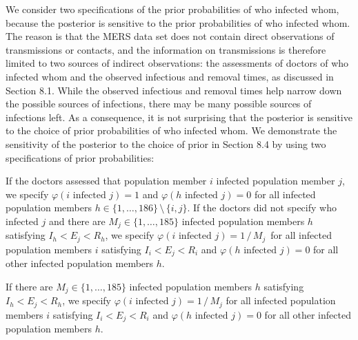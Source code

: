 We consider two specifications of the prior probabilities of who infected whom,
because the posterior is sensitive to the prior probabilities of who infected whom.
The reason is that the MERS data set does not contain direct observations of transmissions or contacts,
and the information on transmissions is therefore limited to two sources of indirect observations:
the assessments of doctors of who infected whom and the observed infectious and removal times,
as discussed in Section 8.1.
While the observed infectious and removal times help narrow down the possible sources of infections,
there may be many possible sources of infections left.
As a consequence,
it is not surprising that the posterior is sensitive to the choice of prior probabilities of who infected whom.
We demonstrate the sensitivity of the posterior to the choice of prior in Section 8.4 by using two specifications of prior probabilities:
\bi 
\item[(a)] If the doctors assessed that population member $i$ infected population member $j$,
we specify $\varphi(\mbox{$i$ infected $j$}) = 1$ and $\varphi(\mbox{$h$ infected $j$}) = 0$ for all infected population members $h \in \{1, \dots, 186\}\, \setminus\, \{i, j\}$.
If the doctors did not specify who infected $j$ and there are $M_j \in \{1, \dots, 185\}$ infected population members $h$ satisfying $I_h < E_j < R_h$,
we specify $\varphi(\mbox{$i$ infected $j$}) = 1\, /\, M_j$\, for all infected population members $i$ satisfying $I_i < E_j < R_i$ and $\varphi(\mbox{$h$ infected $j$}) = 0$ for all other infected population members $h$.
\item[(b)] If there are $M_j \in \{1, \dots, 185\}$ infected population members $h$ satisfying $I_h < E_j < R_h$,
we specify $\varphi(\mbox{$i$ infected $j$}) = 1\, /\, M_j$ for all infected population members $i$ satisfying $I_i < E_j < R_i$ and $\varphi(\mbox{$h$ infected $j$}) = 0$ for all other infected population members $h$.
\ei

